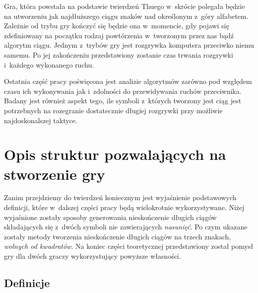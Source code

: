 \documentclass[document]{xmgr}
\begin{document}
Gra, która powstała na podstawie twierdzeń Thuego w~skrócie polegała będzie na utworzeniu jak najdłuższego ciągu znaków nad określonym z~góry alfabetem. Zależnie od trybu gry kończyć się będzie ona w~momencie, gdy pojawi się zdefiniowany na początku rodzaj powtórzenia w~tworzonym przez nas bądź algorytm ciągu. Jednym z~trybów gry jest rozgrywka komputera przeciwko niemu samemu. Po jej zakończeniu przedstawiony zostanie czas trwania rozgrywki i~każdego wykonanego ruchu.

Ostatnia część pracy poświęcona jest analizie algorytmów zarówno pod względem czasu ich wykonywania jak i~zdolności do przewidywania ruchów przeciwnika. Badany jest również aspekt tego, ile symboli z~których tworzony jest ciąg jest potrzebnych na rozegranie dostatecznie długiej rozgrywki przy możliwie najdoskonalszej taktyce.

\chapter{Opis struktur pozwalających na stworzenie gry}
Zanim przejdziemy do twierdzeń koniecznym jest wyjaśnienie podstawowych definicji, które w~dalszej części pracy będą wielokrotnie wykorzystywane. Niżej wyjaśnione zostały sposoby generowania nieskończenie długich ciągów składających się z~dwóch symboli nie zawierających \emph{nasunięć}. Po czym ukazane zostały metody tworzenia nieskończenie długich ciągów na trzech znakach, \emph{wolnych od kwadratów}. Na koniec części teoretycznej przedstawiony został pomysł gry dla dwóch graczy wykorzystujący powyższe własności.


\section{Definicje}
\end{document}
